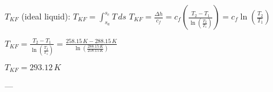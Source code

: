 \( T_{KF} \) (ideal liquid):  
\( T_{KF} = \int_{s_a}^{s_c} T \, ds \)  
\( T_{KF} = \frac{\Delta h}{c_{f}} = c_{f} \left( \frac{T_2 - T_1}{\ln \left( \frac{T_2}{T_1} \right)} \right) = c_{f} \ln \left( \frac{T_2}{T_1} \right) \)  

\( T_{KF} = \frac{T_2 - T_1}{\ln \left( \frac{T_2}{T_1} \right)} = \frac{258.15 \, K - 288.15 \, K}{\ln \left( \frac{288.15 \, K}{258.15 \, K} \right)} \)  

\( T_{KF} = 293.12 \, K \)  

---